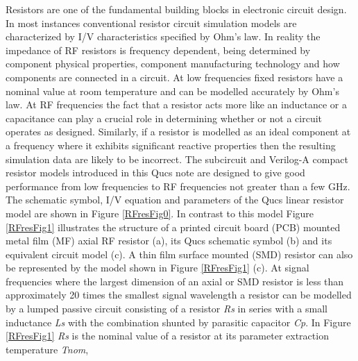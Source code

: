 %

%
%
%

Resistors are one of the fundamental building blocks in electronic circuit design.
In most instances conventional resistor circuit simulation models are characterized by I/V characteristics specified by Ohm's law.
In reality the impedance of RF resistors is frequency dependent, being determined by component physical properties, component manufacturing technology and how components are connected in a circuit.
At low frequencies fixed resistors have a nominal value at room temperature and can be modelled accurately by Ohm's law.
At RF frequencies the fact that a resistor acts more like an inductance or a capacitance can play a crucial role in determining whether or not a circuit operates as designed.
Similarly, if a resistor is modelled as an ideal component at a frequency where it exhibits significant reactive properties then the resulting simulation data are likely to be incorrect.
The subcircuit and Verilog-A compact resistor models introduced in this Qucs note are designed to give good performance from low frequencies to RF
frequencies not greater than a few GHz.
The schematic symbol, I/V equation and parameters of the  Qucs linear resistor model are shown in Figure \ref{RFresFig0}.
In contrast to this model Figure \ref{RFresFig1} illustrates the structure of a printed circuit board (PCB) mounted metal film (MF) axial RF resistor (a),
its Qucs schematic symbol (b) and its equivalent circuit model (c). A thin film surface mounted (SMD) resistor can also be represented by the model shown in Figure
\ref{RFresFig1} (c).
At signal frequencies where the largest dimension of an axial or SMD resistor is less than approximately 20 times the smallest signal wavelength a resistor can
be modelled by a lumped passive circuit consisting of a resistor \textit{Rs} in series with a small inductance \textit{Ls} with the combination shunted by parasitic capacitor \textit{Cp}.
In Figure \ref{RFresFig1} \textit{Rs} is the nominal value of a resistor at its parameter extraction temperature \textit{Tnom},
